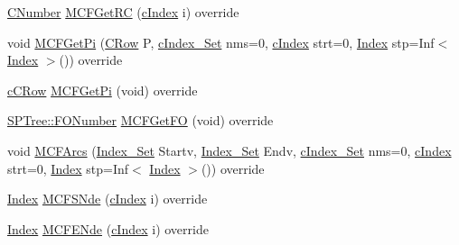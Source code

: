 \begin{DoxyCompactItemize}
\item 
\mbox{\hyperlink{class_m_c_f_class_a24d0627ba8213afe1ec4ebeb4508e8f1}{C\+Number}} \mbox{\hyperlink{class_s_p_tree_af760d0f98c95f89378b36d14b4e98551}{M\+C\+F\+Get\+RC}} (\mbox{\hyperlink{class_m_c_f_class_a76aaabb20535c51a2752b93f6c38fe54}{c\+Index}} i) override
\item 
void \mbox{\hyperlink{class_s_p_tree_a59f02d7f6b2b033bf7a9c45774a26397}{M\+C\+F\+Get\+Pi}} (\mbox{\hyperlink{class_m_c_f_class_a62409402be4e4b301e1a568f99f877be}{C\+Row}} P, \mbox{\hyperlink{class_m_c_f_class_a81575b2d4e4d5636b17170432150ae69}{c\+Index\+\_\+\+Set}} nms=0, \mbox{\hyperlink{class_m_c_f_class_a76aaabb20535c51a2752b93f6c38fe54}{c\+Index}} strt=0, \mbox{\hyperlink{class_m_c_f_class_ad53d6229d7ec28555a9c9c2fd9abf773}{Index}} stp=Inf$<$ \mbox{\hyperlink{class_m_c_f_class_ad53d6229d7ec28555a9c9c2fd9abf773}{Index}} $>$()) override
\item 
\mbox{\hyperlink{class_m_c_f_class_ab700102e9ba8bb6015be6818d4e99097}{c\+C\+Row}} \mbox{\hyperlink{class_s_p_tree_a2eb8e4b396fb6d82d56dcb9b7fbe871b}{M\+C\+F\+Get\+Pi}} (void) override
\item 
\mbox{\hyperlink{class_m_c_f_class_af5ee7b3099b0bc780a6a4b43629488fa}{S\+P\+Tree\+::\+F\+O\+Number}} \mbox{\hyperlink{class_s_p_tree_a55b9b095d557852a91b68c973236518a}{M\+C\+F\+Get\+FO}} (void) override
\item 
void \mbox{\hyperlink{class_s_p_tree_a616a201fc11126e95b77f76aac2e110e}{M\+C\+F\+Arcs}} (\mbox{\hyperlink{class_m_c_f_class_ace3388eb329ff0551a0b86b6c67e33d8}{Index\+\_\+\+Set}} Startv, \mbox{\hyperlink{class_m_c_f_class_ace3388eb329ff0551a0b86b6c67e33d8}{Index\+\_\+\+Set}} Endv, \mbox{\hyperlink{class_m_c_f_class_a81575b2d4e4d5636b17170432150ae69}{c\+Index\+\_\+\+Set}} nms=0, \mbox{\hyperlink{class_m_c_f_class_a76aaabb20535c51a2752b93f6c38fe54}{c\+Index}} strt=0, \mbox{\hyperlink{class_m_c_f_class_ad53d6229d7ec28555a9c9c2fd9abf773}{Index}} stp=Inf$<$ \mbox{\hyperlink{class_m_c_f_class_ad53d6229d7ec28555a9c9c2fd9abf773}{Index}} $>$()) override
\item 
\mbox{\hyperlink{class_m_c_f_class_ad53d6229d7ec28555a9c9c2fd9abf773}{Index}} \mbox{\hyperlink{class_s_p_tree_a5e055b278894b83056cf4e5936ba2c04}{M\+C\+F\+S\+Nde}} (\mbox{\hyperlink{class_m_c_f_class_a76aaabb20535c51a2752b93f6c38fe54}{c\+Index}} i) override
\item 
\mbox{\hyperlink{class_m_c_f_class_ad53d6229d7ec28555a9c9c2fd9abf773}{Index}} \mbox{\hyperlink{class_s_p_tree_a0681160a038aafd90866b8b2cb49c29c}{M\+C\+F\+E\+Nde}} (\mbox{\hyperlink{class_m_c_f_class_a76aaabb20535c51a2752b93f6c38fe54}{c\+Index}} i) override

\end{DoxyCompactItemize}
